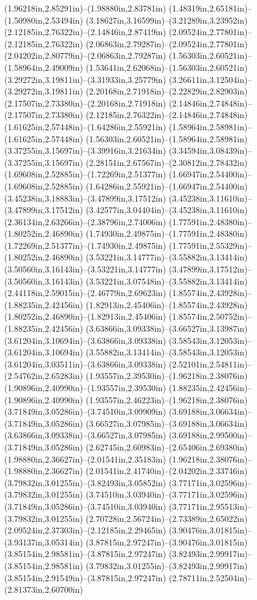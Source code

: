 (1.96218in,2.85291in)--(1.98880in,2.83781in) (1.48319in,2.65181in)--(1.50980in,2.53494in) (3.18627in,3.16599in)--(3.21289in,3.23952in) (2.12185in,2.76322in)--(2.14846in,2.87419in) (2.09524in,2.77801in)--(2.12185in,2.76322in) (2.06863in,2.79287in)--(2.09524in,2.77801in) (2.04202in,2.80779in)--(2.06863in,2.79287in) (1.56303in,2.60521in)--(1.58964in,2.49009in) (1.53641in,2.62068in)--(1.56303in,2.60521in) (3.29272in,3.19811in)--(3.31933in,3.25779in) (3.26611in,3.12504in)--(3.29272in,3.19811in) (2.20168in,2.71918in)--(2.22829in,2.82903in) (2.17507in,2.73380in)--(2.20168in,2.71918in) (2.14846in,2.74848in)--(2.17507in,2.73380in) (2.12185in,2.76322in)--(2.14846in,2.74848in) (1.61625in,2.57448in)--(1.64286in,2.55921in) (1.58964in,2.58981in)--(1.61625in,2.57448in) (1.56303in,2.60521in)--(1.58964in,2.58981in) (3.37255in,3.15697in)--(3.39916in,3.21634in) (3.34594in,3.08439in)--(3.37255in,3.15697in) (2.28151in,2.67567in)--(2.30812in,2.78432in) (1.69608in,2.52885in)--(1.72269in,2.51377in) (1.66947in,2.54400in)--(1.69608in,2.52885in) (1.64286in,2.55921in)--(1.66947in,2.54400in) (3.45238in,3.18883in)--(3.47899in,3.17512in) (3.45238in,3.11610in)--(3.47899in,3.17512in) (3.42577in,3.04404in)--(3.45238in,3.11610in) (2.36134in,2.63266in)--(2.38796in,2.74006in) (1.77591in,2.48380in)--(1.80252in,2.46890in) (1.74930in,2.49875in)--(1.77591in,2.48380in) (1.72269in,2.51377in)--(1.74930in,2.49875in) (1.77591in,2.55329in)--(1.80252in,2.46890in) (3.53221in,3.14777in)--(3.55882in,3.13414in) (3.50560in,3.16143in)--(3.53221in,3.14777in) (3.47899in,3.17512in)--(3.50560in,3.16143in) (3.53221in,3.07548in)--(3.55882in,3.13414in) (2.44118in,2.59015in)--(2.46779in,2.69623in) (1.85574in,2.43928in)--(1.88235in,2.42456in) (1.82913in,2.45406in)--(1.85574in,2.43928in) (1.80252in,2.46890in)--(1.82913in,2.45406in) (1.85574in,2.50752in)--(1.88235in,2.42456in) (3.63866in,3.09338in)--(3.66527in,3.13987in) (3.61204in,3.10694in)--(3.63866in,3.09338in) (3.58543in,3.12053in)--(3.61204in,3.10694in) (3.55882in,3.13414in)--(3.58543in,3.12053in) (3.61204in,3.03511in)--(3.63866in,3.09338in) (2.52101in,2.54811in)--(2.54762in,2.65283in) (1.93557in,2.39530in)--(1.96218in,2.38076in) (1.90896in,2.40990in)--(1.93557in,2.39530in) (1.88235in,2.42456in)--(1.90896in,2.40990in) (1.93557in,2.46223in)--(1.96218in,2.38076in) (3.71849in,3.05286in)--(3.74510in,3.09909in) (3.69188in,3.06634in)--(3.71849in,3.05286in) (3.66527in,3.07985in)--(3.69188in,3.06634in) (3.63866in,3.09338in)--(3.66527in,3.07985in) (3.69188in,2.99500in)--(3.71849in,3.05286in) (2.62745in,2.60983in)--(2.65406in,2.69380in) (1.98880in,2.36627in)--(2.01541in,2.35183in) (1.96218in,2.38076in)--(1.98880in,2.36627in) (2.01541in,2.41740in)--(2.04202in,2.33746in) (3.79832in,3.01255in)--(3.82493in,3.05852in) (3.77171in,3.02596in)--(3.79832in,3.01255in) (3.74510in,3.03940in)--(3.77171in,3.02596in) (3.71849in,3.05286in)--(3.74510in,3.03940in) (3.77171in,2.95513in)--(3.79832in,3.01255in) (2.70728in,2.56724in)--(2.73389in,2.65022in) (2.09524in,2.37303in)--(2.12185in,2.29465in) (3.90476in,3.01815in)--(3.93137in,3.05314in) (3.87815in,2.97247in)--(3.90476in,3.01815in) (3.85154in,2.98581in)--(3.87815in,2.97247in) (3.82493in,2.99917in)--(3.85154in,2.98581in) (3.79832in,3.01255in)--(3.82493in,2.99917in) (3.85154in,2.91549in)--(3.87815in,2.97247in) (2.78711in,2.52504in)--(2.81373in,2.60700in) 